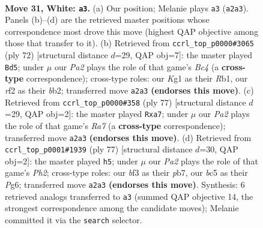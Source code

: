 \documentclass[11pt]{article}
\begin{document}
\clearpage

\begin{figure}[p]\centering
\begin{subfigure}{0.46\textwidth}\centering
\resizebox{\linewidth}{!}{%
\newchessgame
\chessboard[
  setfen={1n2k3/8/8/ppb2p2/8/5b2/P4r2/6K1 w - - 0 31},
  showmover=false,
  pgfstyle=straightmove, color=movearrow, markmove={a2-a3}
]}
\caption{}
\end{subfigure}\hfill
\begin{subfigure}{0.46\textwidth}\centering
\resizebox{\linewidth}{!}{%
\newchessgame
\chessboard[
  setfen={5k2/7p/3p4/8/2B2P2/5K2/1b5r/1R6 w - - 0 37},
  showmover=false,
  pgfstyle=straightmove, color=movearrow, markmove={c4-d5}
]}
\caption{}
\end{subfigure}
\\[4pt]
\begin{subfigure}{0.46\textwidth}\centering
\resizebox{\linewidth}{!}{%
\newchessgame
\chessboard[
  setfen={8/R7/4kb2/8/4K1p1/1P2B3/r7/8 b - - 0 39},
  showmover=false,
  pgfstyle=straightmove, color=movearrow, markmove={a2-a7}
]}
\caption{}
\end{subfigure}\hfill
\begin{subfigure}{0.46\textwidth}\centering
\resizebox{\linewidth}{!}{%
\newchessgame
\chessboard[
  setfen={8/1P3R1p/6p1/4k3/8/4K2P/1r6/8 b - - 0 39},
  showmover=false,
  pgfstyle=straightmove, color=movearrow, markmove={h7-h5}
]}
\caption{}
\end{subfigure}
\caption{\textbf{Move 31, White: \texttt{a3}.} (a) Our position; Melanie plays \texttt{a3} (\texttt{a2a3}). Panels (b)--(d) are the retrieved master positions whose correspondence most drove this move (highest QAP objective among those that transfer to it). (b) Retrieved from \texttt{ccrl\_top\_p0000\#3065} (ply 72) [structural distance $d$=29, QAP obj=7]: the master played \texttt{Bd5}; under $\mu$ our \emph{Pa2} plays the role of that game's \emph{Bc4} (a \textbf{cross-type} correspondence); cross-type roles: our \emph{K}g1 as their \emph{R}b1, our \emph{r}f2 as their \emph{b}b2; transferred move \texttt{a2a3} \textbf{(endorses this move)}. (c) Retrieved from \texttt{ccrl\_top\_p0000\#358} (ply 77) [structural distance $d$=29, QAP obj=2]: the master played \texttt{Rxa7}; under $\mu$ our \emph{Pa2} plays the role of that game's \emph{Ra7} (a \textbf{cross-type} correspondence); transferred move \texttt{a2a3} \textbf{(endorses this move)}. (d) Retrieved from \texttt{ccrl\_top\_p0001\#1939} (ply 77) [structural distance $d$=30, QAP obj=2]: the master played \texttt{h5}; under $\mu$ our \emph{Pa2} plays the role of that game's \emph{Ph2}; cross-type roles: our \emph{b}f3 as their \emph{p}b7, our \emph{b}c5 as their \emph{P}g6; transferred move \texttt{a2a3} \textbf{(endorses this move)}. Synthesis: 6 retrieved analogs transferred to \texttt{a3} (summed QAP objective 14, the strongest correspondence among the candidate moves); Melanie committed it via the \texttt{search} selector.}
\label{fig:thought-m60}
\end{figure}
\end{document}
